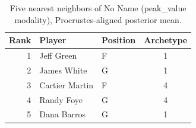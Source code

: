 \begin{table}[htbp]
  \centering\small
  \begin{tabular}{rllc}
    \toprule
    Rank & Player & Position & Archetype \\
    \midrule
    1 & Jeff Green & F & 1 \\
    2 & James White & G & 1 \\
    3 & Cartier Martin & F & 4 \\
    4 & Randy Foye & G & 4 \\
    5 & Dana Barros & G & 1 \\
    \bottomrule
  \end{tabular}
  \caption{Five nearest neighbors of No Name (peak_value modality), Procrustes-aligned posterior mean.}
  \label{tab:No_Name_neighbors_peak_value}
\end{table}

